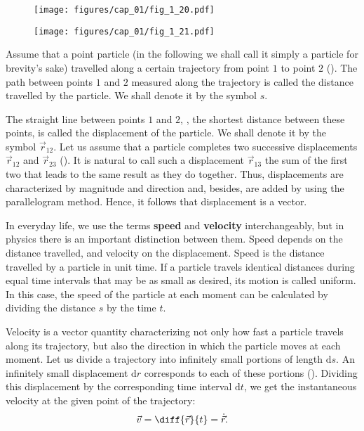 \begin{figure}[t]
	\begin{minipage}[t]{0.5\linewidth}
		\begin{center}
			\texttt{[image: figures/cap\_01/fig\_1\_20.pdf]}
			\caption[]{}
			\label{fig:1_20}
		\end{center}
	\end{minipage}
	\hfill{ }%
	\begin{minipage}[t]{0.5\linewidth}
		\begin{center}
			\texttt{[image: figures/cap\_01/fig\_1\_21.pdf]}
			\caption[]{}
			\label{fig:1_21}
		\end{center}
	\end{minipage}
\end{figure}

Assume that a point particle (in the following we shall call it simply a particle for brevity's sake) travelled along a certain trajectory from point $1$ to point $2$ (). The path between points $1$ and $2$ measured along the trajectory is called the distance travelled by the particle. We shall denote it by the symbol $s$.

The straight line between points $1$ and $2$, \ie, the shortest distance between these points, is called the displacement of the particle. We shall denote it by the symbol $\vec{r}_{12}$. Let us assume that a particle completes two successive displacements $\vec{r}_{12}$ and $\vec{r}_{23}$ (). It is natural to call such a displacement $\vec{r}_{13}$ the sum of the first two that leads to the same result as they do together. Thus, displacements are characterized by magnitude and direction and, besides, are added by using the parallelogram method. Hence, it follows that displacement is a vector.

In everyday life, we use the terms \textbf{speed} and \textbf{velocity} interchangeably, but in physics there is an important distinction between them. Speed depends on the distance travelled, and velocity on the displacement. Speed is the distance travelled by a particle in unit time. If a particle travels identical distances during equal time intervals that may be as small as desired, its motion is called uniform. In this case, the speed of the particle at each moment can be calculated by dividing the distance $s$ by the time $t$.

Velocity is a vector quantity characterizing not only how fast a particle travels along its trajectory, but also the direction in which the particle moves at each moment. Let us divide a trajectory into infinitely small portions of length $\mathrm{d}s$. An infinitely small displacement $\mathrm{d}r$ corresponds to each of these portions (). Dividing this displacement by the corresponding time interval $\mathrm{d}t$, we get the instantaneous velocity at the given point of the trajectory:
\begin{equation}\label{eq:1_57}
\vec{v} = \diff{\vec{r}}{t} = \dot{\vec{r}}.
\end{equation}

